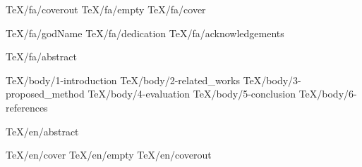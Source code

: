 \documentclass [
	a4paper, %
	14pt, %
	oneside %
] {report} %
\begin{document}
	 {TeX/fa/coverout}
     {TeX/fa/empty}
	 {TeX/fa/cover}
    
     {TeX/fa/godName}
     {TeX/fa/dedication}
     {TeX/fa/acknowledgements}






	
	
	 {TeX/fa/abstract}

	\tableofcontents
	
	\begingroup
		\let\clearpage\relax
		\listoffigures
		\listoftables
	\endgroup

	
	 {TeX/body/1-introduction}
	 {TeX/body/2-related_works}
	 {TeX/body/3-proposed_method}
	 {TeX/body/4-evaluation}
	 {TeX/body/5-conclusion}
	 {TeX/body/6-references}
	
	\begin {latin}
		 {TeX/en/abstract}
		
		 {TeX/en/cover}
 		 {TeX/en/empty}
   		 {TeX/en/coverout}
	\end {latin}
\end{document}
